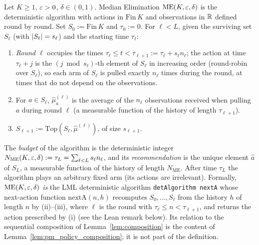 \begin{definition}\label{def:median_elimination}
\leanok
{}
Let $K\ge1$, $\varepsilon>0$, $\delta\in(0,1)$. Median Elimination $\mathrm{ME}(K,\varepsilon,\delta)$ is the
deterministic algorithm with actions in $\mathrm{Fin}\,K$ and observations in $\mathbb{R}$ defined round
by round. Set $S_0 := \mathrm{Fin}\,K$ and $\tau_0 := 0$. For $\ell<L$, given the surviving set
$S_\ell$ (with $\lvert S_\ell \rvert = s_\ell$) and the starting time $\tau_\ell$:
\begin{enumerate}
  \item[(i)] \emph{Round $\ell$} occupies the times $\tau_\ell\le t<\tau_{\ell+1} := \tau_\ell + s_\ell n_\ell$;
        the action at time $\tau_\ell + j$ is the $(j\bmod s_\ell)$-th element of $S_\ell$ in
        increasing order (round-robin over $S_\ell$), so each arm of $S_\ell$ is pulled exactly
        $n_\ell$ times during the round, at times that do not depend on the observations.
  \item[(ii)] For $a\in S_\ell$, $\hat\mu^{(\ell)}_a$ is the average of the $n_\ell$ observations
        received when pulling $a$ during round $\ell$ (a measurable function of the history of
        length $\tau_{\ell+1}$).
  \item[(iii)] $S_{\ell+1} := \mathrm{Top}(S_\ell,\hat\mu^{(\ell)})$, of size $s_{\ell+1}$.
\end{enumerate}
The \emph{budget} of the algorithm is the deterministic integer
$N_{\mathrm{ME}}(K,\varepsilon,\delta) := \tau_L = \sum_{\ell<L}s_\ell n_\ell$, and its
\emph{recommendation} is the unique element $\hat a$ of $S_L$, a measurable function of the
history of length $N_{\mathrm{ME}}$. After time $\tau_L$ the algorithm plays an arbitrary fixed
arm (its actions are irrelevant). Formally, $\mathrm{ME}(K,\varepsilon,\delta)$ \emph{is} the LML
deterministic algorithm \texttt{detAlgorithm nextA} whose next-action function
$\mathrm{nextA}(n,h)$ recomputes $S_0,\dots,S_\ell$ from the history $h$ of length $n$ by
(ii)--(iii), where $\ell$ is the round with $\tau_\ell\le n<\tau_{\ell+1}$, and returns the
action prescribed by (i) (see the Lean remark below). Its relation to the sequential
composition of Lemma~\ref{lem:composition} is the content of
Lemma~\ref{lem:pm_policy_composition}; it is not part of the definition.
\end{definition}

